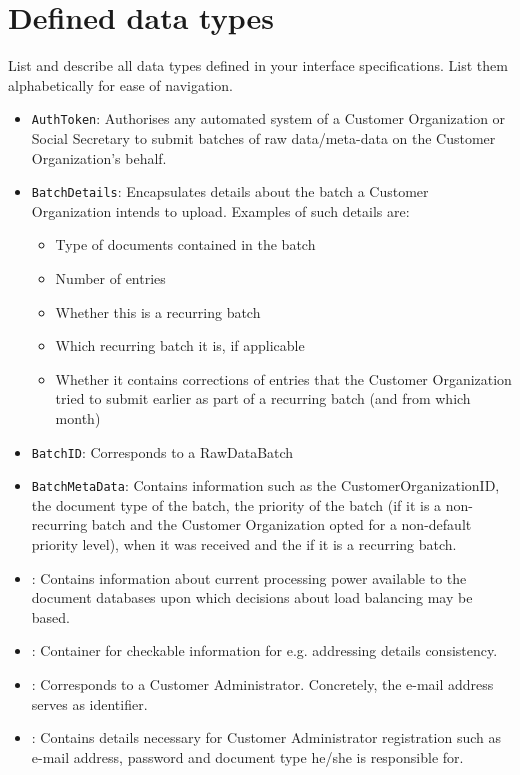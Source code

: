 \section{Defined data types}\label{app:datatypes}
List and describe all data types defined in your interface specifications. List
them alphabetically for ease of navigation.

\begin{itemize}
	\item \texttt{AuthToken}: Authorises any automated system of a Customer Organization or Social Secretary to submit batches of raw data/meta-data on the Customer Organization's behalf.
	\item \texttt{BatchDetails}: Encapsulates details about the batch a Customer Organization intends to upload. Examples of such details are:
	\begin{itemize}
		\item Type of documents contained in the batch
		\item Number of entries
		\item Whether this is a recurring batch
		\item Which recurring batch it is, if applicable
		\item Whether it contains corrections of entries that the Customer Organization tried to submit earlier as part of a recurring batch (and from which month)
	\end{itemize}
	\item \texttt{BatchID}: Corresponds to a RawDataBatch
	\item \texttt{BatchMetaData}: Contains information such as the CustomerOrganizationID, the document type of the batch, the priority of the batch (if it is a non-recurring batch and the Customer Organization opted for a non-default priority level), when it was received and the  if it is a recurring batch.
	\item {}: Contains information about current processing power available to the document databases upon which decisions about load balancing may be based.
	\item {}: Container for checkable information for e.g. addressing details consistency.
	\item {}: Corresponds to a Customer Administrator. Concretely, the e-mail address serves as identifier.
	\item {}: Contains details necessary for Customer Administrator registration such as e-mail address, password and document type he/she is responsible for.

\end{itemize}
